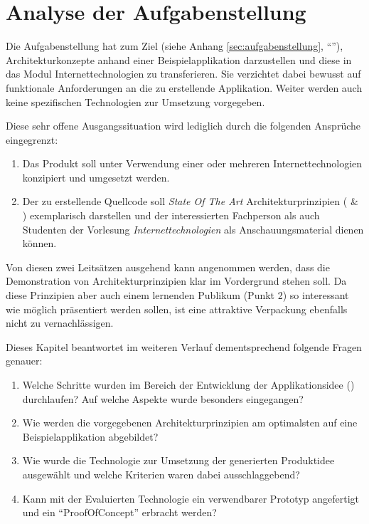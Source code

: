 \chapter{Analyse der Aufgabenstellung}
\label{sec:analyse-der-aufgabenstellung}

Die Aufgabenstellung hat zum Ziel (siehe Anhang \ref{sec:aufgabenstellung}, ``''), Architekturkonzepte anhand einer Beispielapplikation darzustellen und diese in das Modul Internettechnologien zu transferieren. Sie verzichtet dabei bewusst auf funktionale Anforderungen an die zu erstellende Applikation. Weiter werden auch keine spezifischen Technologien zur Umsetzung vorgegeben.

Diese sehr offene Ausgangssituation wird lediglich durch die folgenden Ansprüche eingegrenzt:

\begin{enumerate}
	\item Das Produkt soll unter Verwendung einer oder mehreren Internettechnologien konzipiert und umgesetzt werden.
	\item Der zu erstellende Quellcode soll \emph{State Of The Art} Architekturprinzipien (\cite{ROCA} \& \cite{TilkovSlides}) exemplarisch darstellen und der interessierten Fachperson als auch Studenten der Vorlesung \emph{Internettechnologien} als Anschauungsmaterial dienen können.
\end{enumerate}

Von diesen zwei Leitsätzen ausgehend kann angenommen werden, dass die Demonstration von Architekturprinzipien klar im Vordergrund stehen soll. Da diese Prinzipien aber auch einem lernenden Publikum (Punkt 2) so interessant wie möglich präsentiert werden sollen, ist eine attraktive Verpackung ebenfalls nicht zu vernachlässigen.

Dieses Kapitel beantwortet im weiteren Verlauf dementsprechend folgende Fragen genauer:

\begin{enumerate}
	\item Welche Schritte wurden im Bereich der Entwicklung der Applikationsidee () durchlaufen? Auf welche Aspekte wurde besonders eingegangen?
	\item Wie werden die vorgegebenen Architekturprinzipien am optimalsten auf eine Beispielapplikation abgebildet?
	\item Wie wurde die Technologie zur Umsetzung der generierten Produktidee ausgewählt und welche Kriterien waren dabei ausschlaggebend?
	\item Kann mit der Evaluierten Technologie ein verwendbarer Prototyp angefertigt und ein ``\gls{ProofOfConcept}'' erbracht werden?
\end{enumerate}

\newpage


\newpage


\newpage


\newpage


